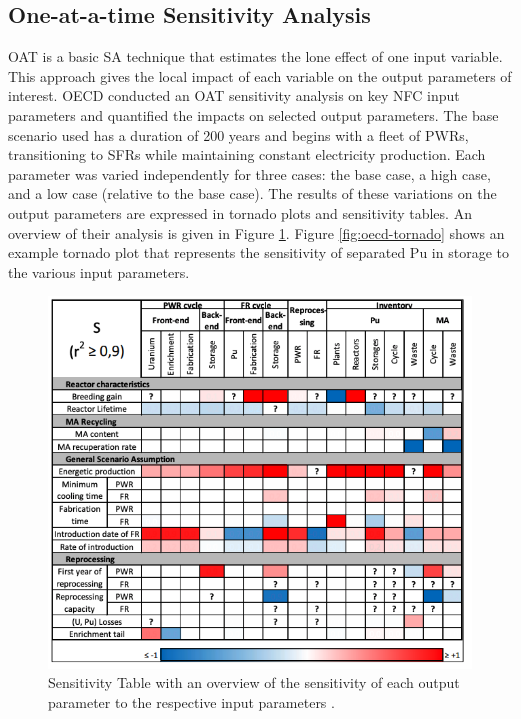 \subsection{One-at-a-time Sensitivity Analysis}
OAT is a basic \gls{SA} technique that estimates 
the lone effect of one input variable. 
This approach gives the local impact of each variable on the 
output parameters of interest. 
OECD conducted an OAT sensitivity analysis \cite{noauthor_effects_2017} 
on key \gls{NFC} input parameters
and quantified the impacts on selected output parameters. 
The base scenario used has a duration of 200 years and begins 
with a fleet of \glspl{PWR}, transitioning to \glspl{SFR} while 
maintaining constant electricity production. 
Each parameter was varied independently for three cases: 
the base case, a high case, and a low case (relative to the base 
case). 
The results of these variations on the output parameters 
are expressed in tornado plots and sensitivity tables. 
An overview of their analysis is given in 
Figure \ref{fig:oecd-sensitivitytable}. 
Figure \ref{fig:oecd-tornado} shows an example tornado plot that represents 
the sensitivity of separated Pu in storage to the various input parameters. 

\begin{figure}[]
	\begin{center}
		\includegraphics[scale=0.55]{./figures/oecd-sensitivitytable.png}
	\end{center}	
		\caption{Sensitivity Table with an overview of the sensitivity 
		of each output parameter to the respective input parameters \cite{noauthor_effects_2017}.}
	\label{fig:oecd-sensitivitytable}
\end{figure}

